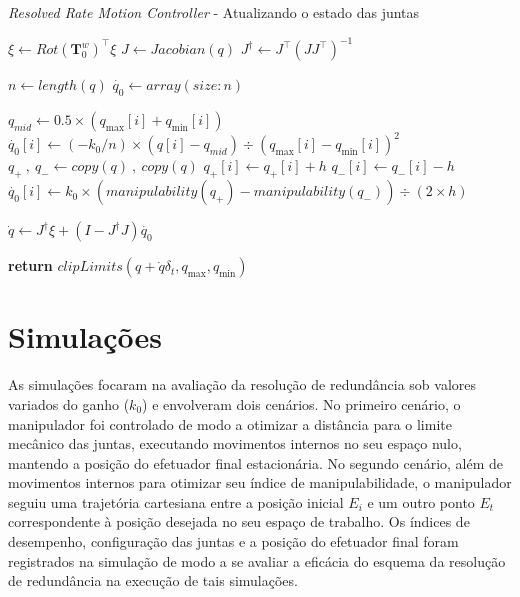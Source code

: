 \begin{algorithm}
    \caption{\emph{Resolved Rate Motion Controller} {-} Atualizando o estado das juntas}\label{rrc-alg}
    \begin{algorithmic}[1]
        \State$\xi \gets {Rot(\mathbf{T}^w_0)}^\top \xi$
        \State$J \gets Jacobian(q)$
        \State$J^\dag \gets J^\top {(J J^\top)}^{-1}$

        \State$n \gets length(q)$
        \State$\dot{q_0} \gets array(size: n)$

         
        \State$q_{mid} \gets 0.5 \times (q_{\max}[i] + q_{\min}[i])$
        \State$\dot{q_0}[i] \gets (-k_0 / n) \times (q[i] - q_{mid}) \div {{(q_{\max}[i] - q_{\min}[i])}^2}$
        \State$q_{+} \ , \ q_{-} \gets copy(q) \ , \ copy(q)$
        \State$q_{+}[i] \gets q_{+}[i] + h$
        \State$q_{-}[i] \gets q_{-}[i] - h$
        \State$\dot{q_0}[i] \gets k_0 \times (manipulability(q_{+}) - manipulability(q_{-})) \div (2 \times h)$
        \EndIf{}
        \EndFor{}

        \State$\dot{q} \gets J^\dag \xi + (I - J^\dag J) \dot{q_0}$

        \State\textbf{return} $clipLimits(q + \dot{q} \delta_t, q_{\max}, q_{\min})$ 
        \EndProcedure\end{algorithmic}
\end{algorithm}

\section{Simulações}

As simulações focaram na avaliação da resolução de redundância
sob valores variados do ganho (\(k_0\)) e envolveram dois cenários. No primeiro
cenário, o manipulador foi controlado de modo a otimizar a distância para o limite mecânico das juntas, 
executando movimentos internos no seu espaço nulo, mantendo a posição do efetuador final estacionária.
No segundo cenário, além de movimentos internos para otimizar seu índice de manipulabilidade, o manipulador 
seguiu uma trajetória cartesiana entre a posição inicial \(E_i\) e um outro ponto \(E_t\) correspondente à posição desejada
no seu espaço de trabalho. Os índices de desempenho, configuração das juntas e a 
posição do efetuador final foram registrados na simulação de modo a se avaliar 
a eficácia do esquema da resolução de redundância na execução de tais simulações.


